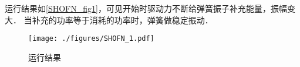 运行结果如\autoref{SHOFN_fig1}，可见开始时驱动力不断给弹簧振子补充能量，振幅变大． 当补充的功率等于消耗的功率时，弹簧做稳定振动．
\begin{figure}[ht]
\centering
\texttt{[image: ./figures/SHOFN\_1.pdf]}
\caption{运行结果}\label{SHOFN_fig1}
\end{figure}












